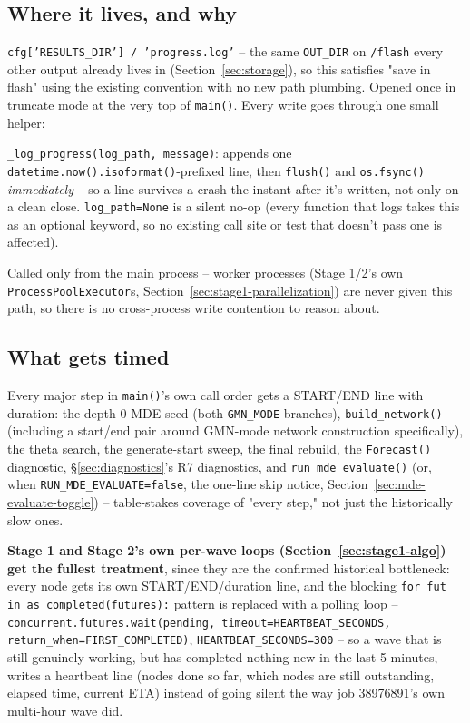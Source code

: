 \documentclass[11pt]{article}
\begin{document}
\subsection{Where it lives, and why}
\texttt{cfg['RESULTS\_DIR'] / 'progress.log'} -- the same \texttt{OUT\_DIR} on \texttt{/flash} every other output already lives in (Section~\ref{sec:storage}), so this satisfies "save in flash" using the existing convention with no new path plumbing. Opened once in truncate mode at the very top of \texttt{main()}. Every write goes through one small helper:
\begin{steps}
\item \texttt{\_log\_progress(log\_path, message)}: appends one \texttt{datetime.now().isoformat()}-prefixed line, then \texttt{flush()} and \texttt{os.fsync()} \emph{immediately} -- so a line survives a crash the instant after it's written, not only on a clean close. \texttt{log\_path=None} is a silent no-op (every function that logs takes this as an optional keyword, so no existing call site or test that doesn't pass one is affected).
\item Called only from the main process -- worker processes (Stage 1/2's own \texttt{ProcessPoolExecutor}s, Section~\ref{sec:stage1-parallelization}) are never given this path, so there is no cross-process write contention to reason about.
\end{steps}

\subsection{What gets timed}
Every major step in \texttt{main()}'s own call order gets a START/END line with duration: the depth-0 MDE seed (both \texttt{GMN\_MODE} branches), \texttt{build\_network()} (including a start/end pair around GMN-mode network construction specifically), the theta search, the generate-start sweep, the final rebuild, the \texttt{Forecast()} diagnostic, \S\ref{sec:diagnostics}'s R7 diagnostics, and \texttt{run\_mde\_evaluate()} (or, when \texttt{RUN\_MDE\_EVALUATE=false}, the one-line skip notice, Section~\ref{sec:mde-evaluate-toggle}) -- table-stakes coverage of "every step," not just the historically slow ones.

\textbf{Stage 1 and Stage 2's own per-wave loops (Section~\ref{sec:stage1-algo}) get the fullest treatment}, since they are the confirmed historical bottleneck: every node gets its own START/END/duration line, and the blocking \texttt{for fut in as\_completed(futures):} pattern is replaced with a polling loop --
\texttt{concurrent.futures.wait(pending, timeout=HEARTBEAT\_SECONDS, return\_when=FIRST\_COMPLETED)}, \texttt{HEARTBEAT\_SECONDS=300} -- so a wave that is still genuinely working, but has completed nothing new in the last 5 minutes, writes a heartbeat line (nodes done so far, which nodes are still outstanding, elapsed time, current ETA) instead of going silent the way job 38976891's own multi-hour wave did.
\end{document}
